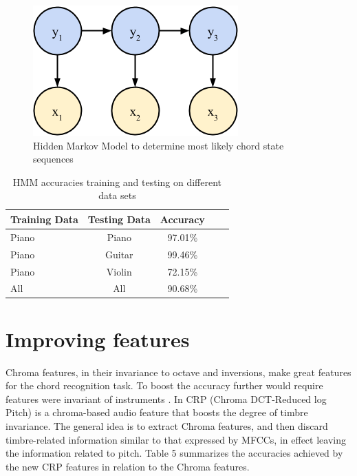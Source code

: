 \documentclass{article}
\begin{document}
\begin{figure}[ht]
\vskip 0.2in
\begin{center}
\centerline{\includegraphics[width=\columnwidth]{hmm}}
\caption{Hidden Markov Model to determine most likely chord state sequences}
\label{icml-historical}
\end{center}
\vskip -0.2in
\end{figure}

\begin{table}[t]
\caption{HMM accuracies training and testing on different data sets}
\label{hmmacc}
\vskip 0.15in
\begin{center}
\begin{small}
\begin{sc}
\begin{tabular}{lcccr}
\hline
\abovespace\belowspace
Training Data & Testing Data & Accuracy \\
\hline
\abovespace
Piano & Piano & 97.01\%\\
Piano & Guitar & 99.46\%\\
Piano & Violin & 72.15\%\\
All & All & 90.68\%\\
\hline
\end{tabular}
\end{sc}
\end{small}
\end{center}
\vskip -0.1in
\end{table}

\section{Improving features}

Chroma features, in their invariance to octave and inversions, make great
features for the chord recognition task. To boost the accuracy further would
require features were invariant of instruments \cite{jiang}. In CRP (Chroma
DCT-Reduced log Pitch) is a chroma-based audio feature that boosts the degree of
timbre invariance. The general idea is to extract Chroma features, and then
discard timbre-related information similar to that expressed by MFCCs, in effect
leaving the information related to pitch. Table 5 summarizes the accuracies
achieved by the new CRP features in relation to the Chroma features.
\end{document}
